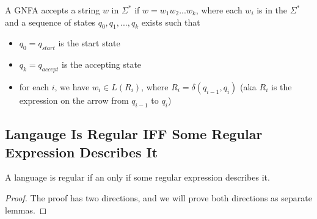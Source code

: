 \documentclass[11pt,a4paper]{article}
\begin{document}
A GNFA accepts a string $w$ in $\Sigma^*$ if $w=w_1w_2...w_k$, where each $w_i$ is in the $\Sigma^*$ and a sequence of states $q_0,q_1,...,q_k$ exists such that
\begin{itemize}
    \item $q_0=q_{start}$ is the start state
    \item $q_k=q_{accept}$ is the accepting state
    \item for each $i$, we have $w_i\in L(R_i)$, where $R_i=\delta(q_{i-1},q_i)$ (aka $R_i$ is the expression on the arrow from $q_{i-1}$ to $q_i$)
\end{itemize}

\subsection{Langauge Is Regular IFF Some Regular Expression Describes It}
\begin{theorem}
    A language is regular if an only if some regular expression describes it.

    \begin{proof}
        The proof has two directions, and we will prove both directions as separate lemmas.
    \end{proof}
\end{theorem}
\end{document}
